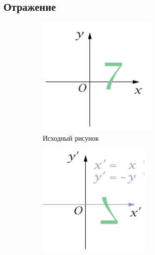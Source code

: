 \documentclass[a4paper, 14pt]{extarticle}
\begin{document}
\subsection{Отражение}
\begin{figure}[h]
	\centering
	\begin{subfigure}[b]{0.2\textwidth}
		\centering
		\includegraphics[width=\textwidth]{l3/S010.jpg}
		\caption{Исходный рисунок}
	\end{subfigure}
	\begin{subfigure}[b]{0.2\textwidth}
		\centering
		\includegraphics[width=\textwidth]{l3/S011.jpg}

\end{subfigure}
\end{figure}
\end{document}

